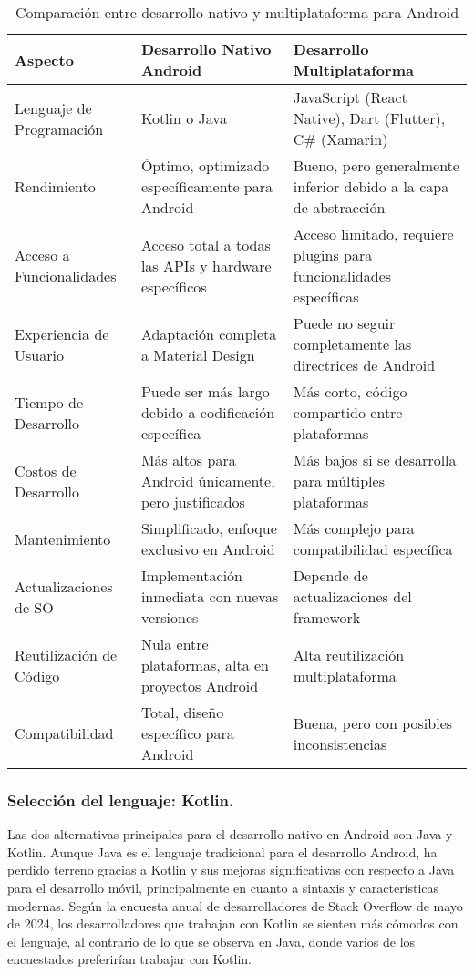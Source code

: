\begin{table}[H]
\centering
\caption{Comparación entre desarrollo nativo y multiplataforma para Android}
\begin{tabular}{|p{}|p{}|p{}|}
\hline
\textbf{Aspecto} & \textbf{Desarrollo Nativo Android} & \textbf{Desarrollo Multiplataforma} \\
\hline
Lenguaje de Programación & Kotlin o Java & JavaScript (React Native), Dart (Flutter), C\# (Xamarin) \\
\hline
Rendimiento & Óptimo, optimizado específicamente para Android & Bueno, pero generalmente inferior debido a la capa de abstracción \\
\hline
Acceso a Funcionalidades & Acceso total a todas las APIs y hardware específicos & Acceso limitado, requiere plugins para funcionalidades específicas \\
\hline
Experiencia de Usuario & Adaptación completa a Material Design & Puede no seguir completamente las directrices de Android \\
\hline
Tiempo de Desarrollo & Puede ser más largo debido a codificación específica & Más corto, código compartido entre plataformas \\
\hline
Costos de Desarrollo & Más altos para Android únicamente, pero justificados & Más bajos si se desarrolla para múltiples plataformas \\
\hline
Mantenimiento & Simplificado, enfoque exclusivo en Android & Más complejo para compatibilidad específica \\
\hline
Actualizaciones de SO & Implementación inmediata con nuevas versiones & Depende de actualizaciones del framework \\
\hline
Reutilización de Código & Nula entre plataformas, alta en proyectos Android & Alta reutilización multiplataforma \\
\hline
Compatibilidad & Total, diseño específico para Android & Buena, pero con posibles inconsistencias \\
\hline
\end{tabular}
\end{table}

\subsubsection{Selección del lenguaje: Kotlin.}

Las dos alternativas principales para el desarrollo nativo en Android son Java y Kotlin. Aunque Java es el lenguaje tradicional para el desarrollo Android, ha perdido terreno gracias a Kotlin y sus mejoras significativas con respecto a Java para el desarrollo móvil, principalmente en cuanto a sintaxis y características modernas. Según la encuesta anual de desarrolladores de Stack Overflow de mayo de 2024, los desarrolladores que trabajan con Kotlin se sienten más cómodos con el lenguaje, al contrario de lo que se observa en Java, donde varios de los encuestados preferirían trabajar con Kotlin.

